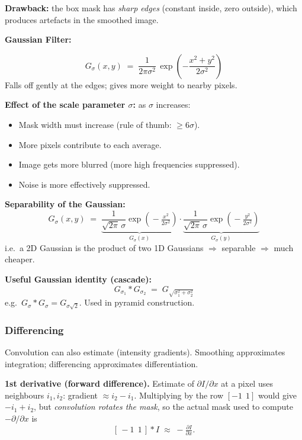 \textbf{Drawback:} the box mask has \emph{sharp edges} (constant inside, zero outside), which produces artefacts in the smoothed image.

\separator

\textbf{Gaussian Filter:}

\begin{defbox}[2D Gaussian]
\[
G_\sigma(x,y) \;=\; \frac{1}{2\pi \sigma^2}\, \exp\!\left(-\frac{x^2 + y^2}{2\sigma^2}\right)
\]
Falls off gently at the edges; gives more weight to nearby pixels.
\end{defbox}

\textbf{Effect of the scale parameter $\sigma$:} as $\sigma$ increases:
\begin{itemize}
  \item Mask width must increase (rule of thumb: $\geq 6\sigma$).
  \item More pixels contribute to each average.
  \item Image gets more blurred (more high frequencies suppressed).
  \item Noise is more effectively suppressed.
\end{itemize}

\textbf{Separability of the Gaussian:}
\[
G_\sigma(x,y) \;=\; \underbrace{\frac{1}{\sqrt{2\pi}\,\sigma}\exp\!\left(\!-\tfrac{x^2}{2\sigma^2}\right)}_{G_\sigma(x)} \cdot \underbrace{\frac{1}{\sqrt{2\pi}\,\sigma}\exp\!\left(\!-\tfrac{y^2}{2\sigma^2}\right)}_{G_\sigma(y)}
\]
i.e.\ a 2D Gaussian is the product of two 1D Gaussians $\Rightarrow$ separable $\Rightarrow$ much cheaper.

\textbf{Useful Gaussian identity (cascade):}
\[
G_{\sigma_1} \ast G_{\sigma_2} \;=\; G_{\sqrt{\sigma_1^2 + \sigma_2^2}}
\]
e.g.\ $G_\sigma \ast G_\sigma = G_{\sigma\sqrt{2}}$. Used in pyramid construction.

\bigseparator

\subsubsection{Differencing}

Convolution can also estimate  (intensity gradients). Smoothing approximates integration; differencing approximates differentiation.

\textbf{1st derivative (forward difference).} Estimate of $\partial I / \partial x$ at a pixel uses neighbours $i_1, i_2$: gradient $\approx i_2 - i_1$. Multiplying by the row $[-1\ \ 1]$ would give $-i_1 + i_2$, but \emph{convolution rotates the mask}, so the actual mask used to compute $-\partial / \partial x$ is
\[
\left[\,-1\ \ 1\,\right] \ast I \;\approx\; -\tfrac{\partial I}{\partial x}.
\]

